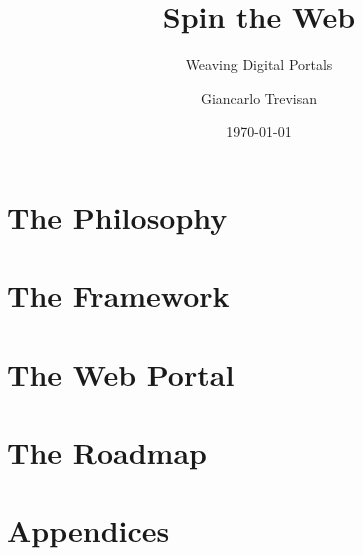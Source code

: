 \documentclass[11pt,openright,twoside,a4paper]{book}
\title{Spin the Web}
\subtitle{Weaving Digital Portals}
\author{Giancarlo Trevisan}
\date{\today}
\begin{document}
\frontmatter






\setcounter{tocdepth}{0}
\tableofcontents

\mainmatter

\part{The Philosophy}






\part{The Framework}









\part{The Web Portal}




\part{The Roadmap}



\part*{Appendices}
\appendix




\backmatter
\nocite{*}


\printglossary
\printindex
\end{document}
